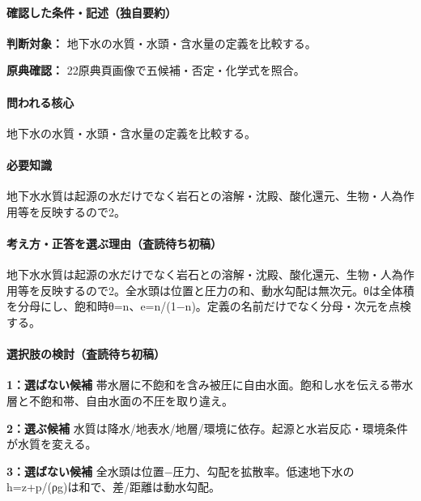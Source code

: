 \paragraph{確認した条件・記述（独自要約）}\mbox{}\par

\noindent\textbf{判断対象：} 地下水の水質・水頭・含水量の定義を比較する。\par

\noindent\textbf{原典確認：} 22原典頁画像で五候補・否定・化学式を照合。\par

\paragraph{問われる核心} 地下水の水質・水頭・含水量の定義を比較する。

\paragraph{必要知識} 地下水水質は起源の水だけでなく岩石との溶解・沈殿、酸化還元、生物・人為作用等を反映するので2。

\paragraph{考え方・正答を選ぶ理由（査読待ち初稿）} 地下水水質は起源の水だけでなく岩石との溶解・沈殿、酸化還元、生物・人為作用等を反映するので2。全水頭は位置と圧力の和、動水勾配は無次元。θは全体積を分母にし、飽和時θ=n、e=\allowbreak{}n/(1−n)。定義の名前だけでなく分母・次元を点検する。

\paragraph{選択肢の検討（査読待ち初稿）}\mbox{}\par

\noindent\textbf{1：選ばない候補} 帯水層に不飽和を含み被圧に自由水面。飽和し水を伝える帯水層と不飽和帯、自由水面の不圧を取り違え。\par

\noindent\textbf{2：選ぶ候補} 水質は降水/地表水/地層/環境に依存。起源と水岩反応・環境条件が水質を変える。\par

\noindent\textbf{3：選ばない候補} 全水頭は位置−圧力、勾配を拡散率。低速地下水のh=\allowbreak{}z+p/(ρg)は和で、差/距離は動水勾配。\par

